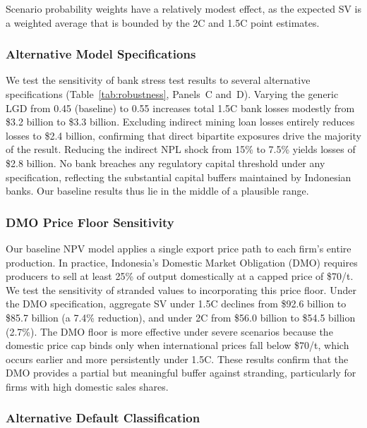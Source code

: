 Scenario probability weights have a relatively modest effect, as the expected SV is a weighted average that is bounded by the 2\textdegree C and 1.5\textdegree C point estimates.

\subsubsection{Alternative Model Specifications}

We test the sensitivity of bank stress test results to several alternative specifications (Table~\ref{tab:robustness}, Panels~C and~D). Varying the generic LGD from 0.45 (baseline) to 0.55 increases total 1.5\textdegree C bank losses modestly from \$3.2 billion to \$3.3 billion. Excluding indirect mining loan losses entirely reduces losses to \$2.4 billion, confirming that direct bipartite exposures drive the majority of the result. Reducing the indirect NPL shock from 15\% to 7.5\% yields losses of \$2.8 billion. No bank breaches any regulatory capital threshold under any specification, reflecting the substantial capital buffers maintained by Indonesian banks. Our baseline results thus lie in the middle of a plausible range.

\subsubsection{DMO Price Floor Sensitivity}

Our baseline NPV model applies a single export price path to each firm's entire production. In practice, Indonesia's Domestic Market Obligation (DMO) requires producers to sell at least 25\% of output domestically at a capped price of \$70/t. We test the sensitivity of stranded values to incorporating this price floor. Under the DMO specification, aggregate SV under 1.5\textdegree C declines from \$92.6 billion to \$85.7 billion (a 7.4\% reduction), and under 2\textdegree C from \$56.0 billion to \$54.5 billion (2.7\%). The DMO floor is more effective under severe scenarios because the domestic price cap binds only when international prices fall below \$70/t, which occurs earlier and more persistently under 1.5\textdegree C. These results confirm that the DMO provides a partial but meaningful buffer against stranding, particularly for firms with high domestic sales shares.

\subsubsection{Alternative Default Classification}

